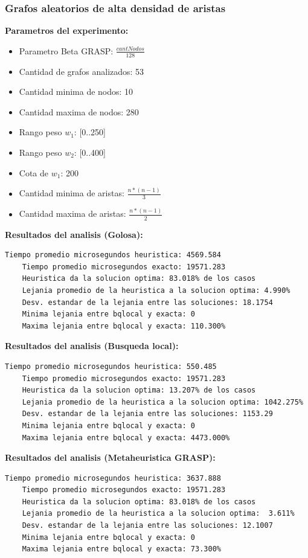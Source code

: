 
\subsubsection{Grafos aleatorios de alta densidad de aristas}
\textbf{Parametros del experimento:}
\begin{itemize}
	\item Parametro Beta GRASP: $\frac{cantNodos}{128}$
	\item Cantidad de grafos analizados: 53
	\item Cantidad minima de nodos: 10
	\item Cantidad maxima de nodos: 280
	\item Rango peso $w_1$: [0..250]
	\item Rango peso $w_2$: [0..400]
	\item Cota de $w_1$: 200
	\item Cantidad minima de aristas: $\frac{n * (n-1)}{3}$
	\item Cantidad maxima de aristas: $\frac{n * (n-1)}{2}$
\end{itemize}

\vspace{1cm}

\textbf{Resultados del analisis (Golosa):}
\begin{lstlisting}[frame=single]	
	Tiempo promedio microsegundos heuristica: 4569.584
	Tiempo promedio microsegundos exacto: 19571.283
	Heuristica da la solucion optima: 83.018% de los casos
	Lejania promedio de la heuristica a la solucion optima: 4.990%
	Desv. estandar de la lejania entre las soluciones: 18.1754
	Minima lejania entre bqlocal y exacta: 0
	Maxima lejania entre bqlocal y exacta: 110.300%
\end{lstlisting}

\textbf{Resultados del analisis (Busqueda local):}
\begin{lstlisting}[frame=single]	
	Tiempo promedio microsegundos heuristica: 550.485
	Tiempo promedio microsegundos exacto: 19571.283
	Heuristica da la solucion optima: 13.207% de los casos
	Lejania promedio de la heuristica a la solucion optima: 1042.275%
	Desv. estandar de la lejania entre las soluciones: 1153.29
	Minima lejania entre bqlocal y exacta: 0
	Maxima lejania entre bqlocal y exacta: 4473.000%
\end{lstlisting}

\textbf{Resultados del analisis (Metaheuristica GRASP):}
\begin{lstlisting}[frame=single]	
	Tiempo promedio microsegundos heuristica: 3637.888
	Tiempo promedio microsegundos exacto: 19571.283
	Heuristica da la solucion optima: 83.018% de los casos
	Lejania promedio de la heuristica a la solucion optima:  3.611%
	Desv. estandar de la lejania entre las soluciones: 12.1007
	Minima lejania entre bqlocal y exacta: 0
	Maxima lejania entre bqlocal y exacta: 73.300%
\end{lstlisting}

